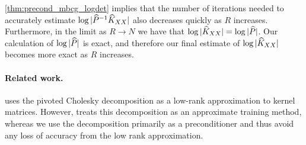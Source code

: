\cref{thm:precond_mbcg_logdet} implies that the number of iterations needed to accurately estimate $\log \vert \widehat{P}^{-1}\widehat{K}_{XX} \vert$ also decreases quickly as $R$ increases.
Furthermore, in the limit as $R \rightarrow N$ we have that $\log \vert \widehat{K}_{XX} \vert = \log \vert \widehat{P} \vert$.
Our calculation of $\log \vert \widehat{P} \vert$ is exact, and therefore our final estimate of $\log \vert \widehat{K}_{XX} \vert$ becomes more exact as $R$ increases.

\paragraph{Related work.}
\citet{bach2013sharp} uses the pivoted Cholesky decomposition as a low-rank approximation to kernel matrices.
However, \citet{bach2013sharp} treats this decomposition as an approximate training method, whereas we use the decomposition primarily as a preconditioner and thus avoid any loss of accuracy from the low rank approximation.



